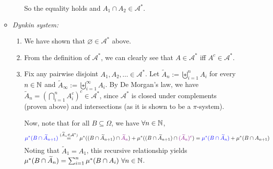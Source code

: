 \begin{enumerate}
\begin{pf}
\begin{itemize}
\begin{enumerate}[label={(\arabic*)}]
So the equality holds and \(A_1\cap A_2\in\mathcal{A}^*\).
\end{enumerate}
\item \emph{Dynkin system:}
\begin{enumerate}[label={(\arabic*)}]
\item We have shown that \(\varnothing\in\mathcal{A}^*\) above.
\item From the definition of \(\mathcal{A}^*\), we can clearly see that
\(A\in\mathcal{A}^*\) iff \(A^c\in\mathcal{A}^*\).
\item Fix any pairwise disjoint \(A_1,A_2,\dotsc\in\mathcal{A}^*\). Let
\(\widetilde{A}_n:=\biguplus_{i=1}^{n}A_i\) for every \(n\in\mathbb{N}\) and
\(\widetilde{A}_{\infty}:=\biguplus_{i=1}^{\infty}A_i\). By De Morgan's law, we
have \(\widetilde{A}_n=(\bigcap_{i=1}^{n}A_i^c)^{c}\in\mathcal{A}^*\), since
\(\mathcal{A}^*\) is closed under complements (proven above) and intersections
(as it is shown to be a \(\pi\)-system).

Now, note that for all \(B\subseteq \Omega\), we have \(\forall n\in\mathbb{N}\),
\[
{\color{blue}\mu^*(B\cap\widetilde{A}_{n+1})}
\overset{(\widetilde{A}_{n}\in\mathcal{A}^*)}{=}
\mu^*((B\cap\widetilde{A}_{n+1})\cap {\color{violet}\widetilde{A}_{n}})
+\mu^*((B\cap\widetilde{A}_{n+1})\cap {\color{violet}(\widetilde{A}_{n})^c})
={\color{blue}\mu^*(B\cap\widetilde{A}_n)}+\mu^*(B\cap A_{n+1})
\]
Noting that \(\widetilde{A}_{1}=A_1\), this recursive relationship yields
\(\mu^*(B\cap\widetilde{A}_{n})=\sum_{i=1}^{n}\mu^*(B\cap A_i)~\forall
n\in\mathbb{N}\).


\end{enumerate}
\end{itemize}
\end{pf}
\end{enumerate}
